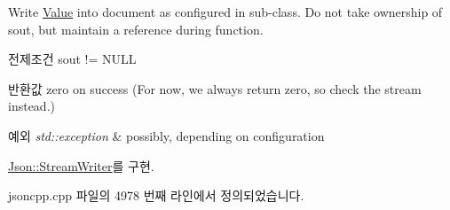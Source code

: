 Write \hyperlink{class_json_1_1_value}{Value} into document as configured in sub-\/class. Do not take ownership of sout, but maintain a reference during function. \begin{DoxyPrecond}{전제조건}
sout != N\+U\+LL 
\end{DoxyPrecond}
\begin{DoxyReturn}{반환값}
zero on success (For now, we always return zero, so check the stream instead.) 
\end{DoxyReturn}

\begin{DoxyExceptions}{예외}
{\em std\+::exception} & possibly, depending on configuration \\
\hline
\end{DoxyExceptions}


\hyperlink{class_json_1_1_stream_writer_a84278bad0c9a9fc587bc2a97c5bb5993}{Json\+::\+Stream\+Writer}를 구현.



jsoncpp.\+cpp 파일의 4978 번째 라인에서 정의되었습니다.


